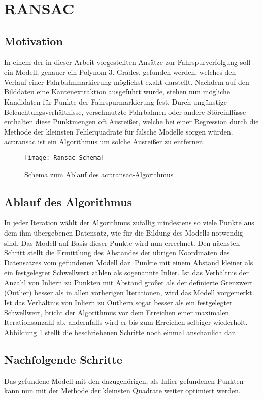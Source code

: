 \section{RANSAC \dcsecondauthorshort}
\subsection{Motivation}
In einem der in dieser Arbeit vorgestellten Ansätze zur Fahrspurverfolgung soll ein Modell, genauer ein Polynom 3. Grades, gefunden werden, welches den Verlauf einer Fahrbahnmarkierung möglichst exakt darstellt. Nachdem auf den Bilddaten eine Kantenextraktion ausgeführt wurde, stehen nun mögliche Kandidaten für Punkte der Fahrspurmarkierung fest. Durch ungünstige Beleuchtungsverhältnisse, verschmutzte Fahrbahnen oder andere Störeinflüsse enthalten diese Punktmengen oft Ausreißer, welche bei einer Regression durch die Methode der kleinsten Fehlerquadrate für falsche Modelle sorgen würden. \gls{acr:ransac} \autocite{fischler1981random} ist ein Algorithmus um solche Ausreißer zu entfernen.

\begin{figure}[H]
  \centering
  \texttt{[image: Ransac\_Schema]}
  \caption{Schema zum Ablauf des \gls{acr:ransac}-Algorithmus}
  \label{fig:ransac_scheme}
\end{figure}

\subsection{Ablauf des Algorithmus} \label{ssec:grunglagen:ransac:ablauf}
In jeder Iteration wählt der Algorithmus zufällig mindestens so viele Punkte aus dem ihm übergebenen Datensatz, wie für die Bildung des Modells notwendig sind. Das Modell auf Basis dieser Punkte wird nun errechnet. Den nächsten Schritt stellt die Ermittlung des Abstandes der übrigen Koordinaten des Datensatzes vom gefundenen Modell dar. Punkte mit einem Abstand kleiner als ein festgelegter Schwellwert zählen als sogenannte Inlier. Ist das Verhältnis der Anzahl von Inliern zu Punkten mit Abstand größer als der definierte Grenzwert (Outlier) besser als in allen vorherigen Iterationen, wird das Modell vorgemerkt. Ist das Verhältnis von Inliern zu Outliern sogar besser als ein festgelegter Schwellwert, bricht der Algorithmus vor dem Erreichen einer maximalen Iterationsanzahl ab, andernfalls wird er bis zum Erreichen selbiger wiederholt. Abbildung \ref{fig:ransac_scheme} stellt die beschriebenen Schritte noch einmal anschaulich dar.

\subsection{Nachfolgende Schritte}
Das gefundene Modell mit den dazugehörigen, als Inlier gefundenen Punkten kann nun mit der Methode der kleinsten Quadrate weiter optimiert werden.




